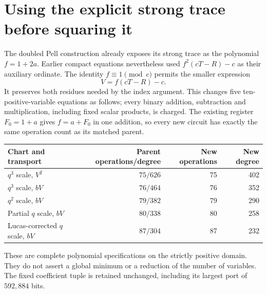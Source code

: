 \section{Using the explicit strong trace before squaring it}
\label{sec:trace-linear}

The doubled Pell construction already exposes its strong trace as the
polynomial $f=1+2a$. Earlier compact equations nevertheless used
$f^2(cT-R)-c$ as their auxiliary ordinate. The identity $f\equiv1\pmod c$
permits the smaller expression
\[
 V=f(cT-R)-c.
\]
It preserves both residues needed by the index argument. This changes five
ten-positive-variable equations as follows; every binary addition,
subtraction and multiplication, including fixed scalar products, is charged.
The existing register $F_0=1+a$ gives $f=a+F_0$ in one addition, so every
new circuit has exactly the same operation count as its matched parent.
\begin{center}
\begin{tabular}{@{}lrrr@{}}
\toprule
Chart and transport & Parent operations/degree & New operations & New degree\\
\midrule
$q^3$ scale, $V^2$ & $75/626$ &75&402\\
$q^3$ scale, $bV$ & $76/464$ &76&352\\
$q^2$ scale, $bV$ & $79/382$ &79&290\\
Partial $q$ scale, $bV$ & $80/338$ &80&258\\
Lucas-corrected $q$ scale, $bV$ & $87/304$ &87&232\\
\bottomrule
\end{tabular}
\end{center}
These are complete polynomial specifications on the strictly positive
domain. They do not assert a global minimum or a reduction of the number
of variables. The fixed coefficient tuple is retained unchanged, including
its largest port of $592{,}884$ bits.

